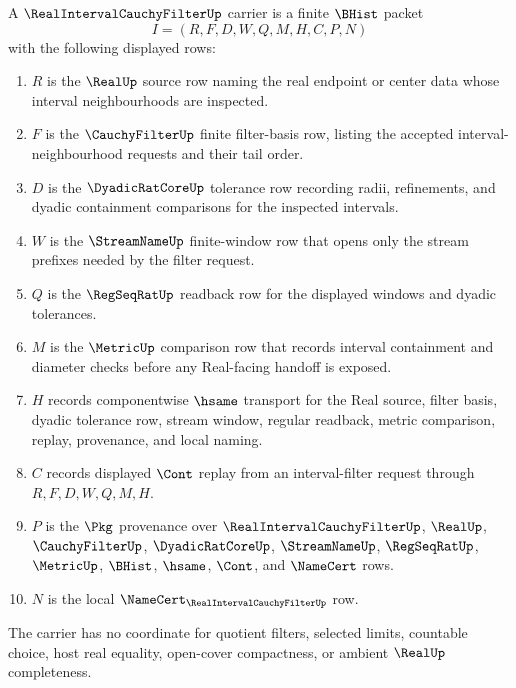\begin{definition}
\label{def:real-interval-cauchy-filter-carrier}
A $\RealIntervalCauchyFilterUp$ carrier is a finite $\BHist$ packet
$$
I=(R,F,D,W,Q,M,H,C,P,N)
$$
with the following displayed rows:
\begin{enumerate}
\item $R$ is the $\RealUp$ source row naming the real endpoint or center data whose interval neighbourhoods are inspected.
\item $F$ is the $\CauchyFilterUp$ finite filter-basis row, listing the accepted interval-neighbourhood requests and their tail order.
\item $D$ is the $\DyadicRatCoreUp$ tolerance row recording radii, refinements, and dyadic containment comparisons for the inspected intervals.
\item $W$ is the $\StreamNameUp$ finite-window row that opens only the stream prefixes needed by the filter request.
\item $Q$ is the $\RegSeqRatUp$ readback row for the displayed windows and dyadic tolerances.
\item $M$ is the $\MetricUp$ comparison row that records interval containment and diameter checks before any Real-facing handoff is exposed.
\item $H$ records componentwise $\hsame$ transport for the Real source, filter basis, dyadic tolerance row, stream window, regular readback, metric comparison, replay, provenance, and local naming.
\item $C$ records displayed $\Cont$ replay from an interval-filter request through $R,F,D,W,Q,M,H$.
\item $P$ is the $\Pkg$ provenance over $\RealIntervalCauchyFilterUp$, $\RealUp$, $\CauchyFilterUp$, $\DyadicRatCoreUp$, $\StreamNameUp$, $\RegSeqRatUp$, $\MetricUp$, $\BHist$, $\hsame$, $\Cont$, and $\NameCert$ rows.
\item $N$ is the local $\NameCert_{\RealIntervalCauchyFilterUp}$ row.
\end{enumerate}
The carrier has no coordinate for quotient filters, selected limits, countable choice, host real equality, open-cover compactness, or ambient $\RealUp$ completeness.
\end{definition}

